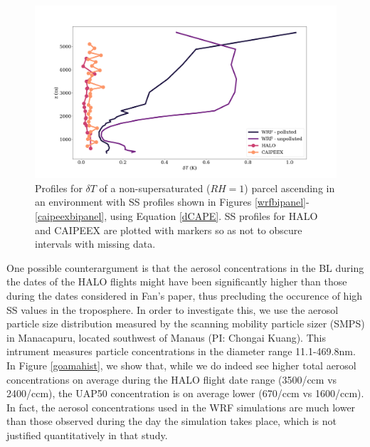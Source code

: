 \documentclass{article}
\begin{document}
\begin{figure}[ht]
    \centering
    \includegraphics[width=12cm]{revmywrf/v1_FINAL_combined_dT_profile_figure.png}
    \caption{Profiles for $\delta T$ of a non-supersaturated ($RH=1$) parcel ascending in an environment with SS profiles shown in Figures \ref{wrfbipanel}-\ref{caipeexbipanel}, using Equation \ref{dCAPE}. SS profiles for HALO and CAIPEEX are plotted with markers so as not to obscure intervals with missing data.}
    \label{dTprofiles}
\end{figure}

One possible counterargument is that the aerosol concentrations in the BL during the dates of the HALO flights might have been significantly higher than those during the dates considered in Fan's paper, thus precluding the occurence of high SS values in the troposphere. In order to investigate this, we use the aerosol particle size distribution measured by the scanning mobility particle sizer (SMPS) in Manacapuru, located southwest of Manaus (PI: Chongai Kuang). This intrument measures particle concentrations in the diameter range 11.1-469.8nm. In Figure \ref{goamahist}, we show that, while we do indeed see higher total aerosol concentrations on average during the HALO flight date range (3500/ccm vs 2400/ccm), the UAP50 concentration is on average lower (670/ccm vs 1600/ccm). In fact, the aerosol concentrations used in the WRF simulations are much lower than those observed during the day the simulation takes place, which is not justified quantitatively in that study.
\end{document}
